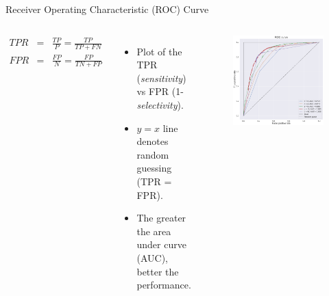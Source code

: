 \documentclass{beamer}
\begin{document}
\begin{frame}{Receiver Operating Characteristic (ROC) Curve}
\begin{columns}
\begin{eqnarray*}
TPR & = & \frac{TP}{P} = \frac{TP}{TP + FN}\\
FPR & = & \frac{FP}{N} = \frac{FP}{TN + FP}
\end{eqnarray*}
\begin{itemize}
    \item Plot of the TPR (\textit{sensitivity}) vs FPR (1-\textit{selectivity}).
    \item $y=x$ line denotes random guessing (TPR = FPR).
    \item The greater the area under curve (AUC), better the performance.
\end{itemize}
    \begin{figure}
    \centering
    \includegraphics[width=\textwidth]{figures/ROC.png}
    \end{figure}
\end{columns}
\end{frame}
\end{document}
